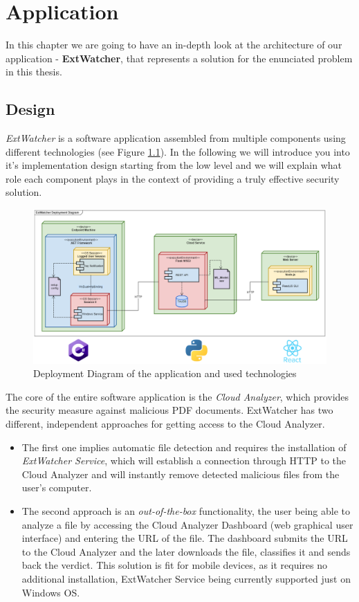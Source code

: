 \chapter{Application}
\label{chapter:application}
In this chapter we are going to have an in-depth look at the architecture of our application - \textbf{ExtWatcher}, that represents a solution for the enunciated problem in this thesis.


\section{Design}
\label{section:design}
\textit{ExtWatcher} is a software application assembled from multiple components using different technologies (see Figure \ref{deployment}). In the following we will introduce you into it's implementation design starting from the low level and we will explain what role each component plays in the context of providing a truly effective security solution. 

\begin{figure}[H]
	\centerline{\includegraphics[scale=0.4]{figures/deployTech.png}}  
	\caption{Deployment Diagram of the application and used technologies}
	\label{deployment}
\end{figure}

The core of the entire software application is the \textit{Cloud Analyzer}, which provides the security measure against malicious PDF documents. ExtWatcher has two different, independent approaches for getting access to the Cloud Analyzer. 

\begin{itemize}
	\item The first one implies automatic file detection and requires the installation of \textit{ExtWatcher Service}, which will establish a connection through HTTP to the Cloud Analyzer and will instantly remove detected malicious files from the user's computer.
	\item The second approach is an \textit{out-of-the-box} functionality, the user being able to analyze a file by accessing the Cloud Analyzer Dashboard (web graphical user interface) and entering the URL of the file. The dashboard submits the URL to the Cloud Analyzer and the later downloads the file, classifies it and sends back the verdict. This solution is fit for mobile devices, as it requires no additional installation, ExtWatcher Service being currently supported just on Windows OS.
\end{itemize}

